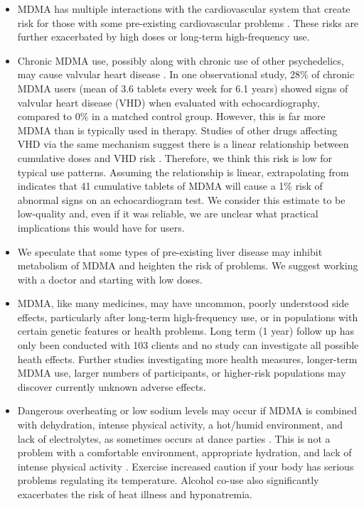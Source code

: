 \documentclass[12pt,letterpaper]{book}
\begin{document}
\begin{itemize}
    \item MDMA has multiple interactions with the cardiovascular system that create risk for those with some pre-existing cardiovascular problems \cite{bonsignoreCardio}. These risks are further exacerbated by high doses or long-term high-frequency use.
    \item Chronic MDMA use, possibly along with chronic use of other psychedelics, may cause valvular heart disease \cite{droogmans2007valvular,tagen2023valvular}. In one observational study, 28\% of chronic MDMA users (mean of 3.6 tablets every week for 6.1 years) showed signs of valvular heart disease (VHD) when evaluated with echocardiography, compared to 0\% in a matched control group. However, this is far more MDMA than is typically used in therapy. Studies of other drugs affecting VHD via the same mechanism suggest there is a linear relationship between cumulative doses and VHD risk \cite{corvol2007heart}. Therefore, we think this risk is low for typical use patterns. Assuming the relationship is linear, extrapolating from \textcite{droogmans2007valvular} indicates that 41 cumulative tablets of MDMA will cause a 1\% risk of abnormal signs on an echocardiogram test. We consider this estimate to be low-quality and, even if it was reliable, we are unclear what practical implications this would have for users.
    \item We speculate that some types of pre-existing liver disease may inhibit metabolism of MDMA and heighten the risk of problems. We suggest working with a doctor and starting with low doses.
    \item MDMA, like many medicines, may have uncommon, poorly understood side effects, particularly after long-term high-frequency use, or in populations with certain genetic features or health problems. Long term (1 year) follow up has only been conducted with 103 clients \cite{jeromeMDMALongTerm} and no study can investigate all possible heath effects. Further studies investigating more health measures, longer-term MDMA use, larger numbers of participants, or higher-risk populations may discover currently unknown adverse effects.
    \item Dangerous overheating or low sodium levels may occur if MDMA is combined with dehydration, intense physical activity, a hot/humid environment, and lack of electrolytes, as sometimes occurs at dance parties \cite{vanOverheatingAlcohol}. This is not a problem with a comfortable environment, appropriate hydration, and lack of intense physical activity \cite{mitchellMDMAClinicalTrial}. Exercise increased caution if your body has serious problems regulating its temperature. Alcohol co-use also significantly exacerbates the risk of heat illness and hyponatremia.

\end{itemize}
\end{document}
